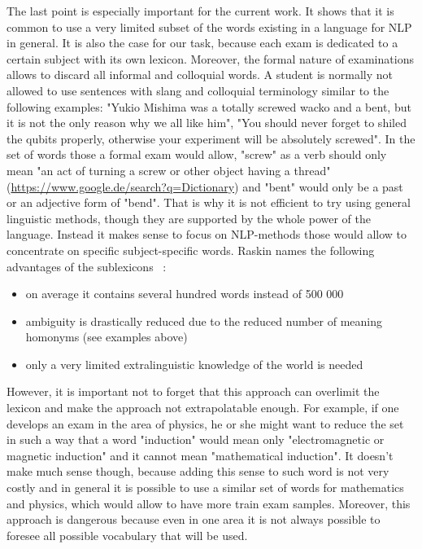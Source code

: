 The last point is especially important for the current work. It shows that it is common to use a very limited subset of the words existing in a language for NLP in general. It is also the case for our task, because each exam is dedicated to a certain subject with its own lexicon. Moreover, the formal nature of examinations allows to discard all informal and colloquial words. A student is normally not allowed to use sentences with slang and colloquial terminology similar to the following examples: "Yukio Mishima was a totally screwed wacko and a bent, but it is not the only reason why we all like him", "You should never forget to shiled the qubits properly, otherwise your experiment will be absolutely screwed". In the set of words those a formal exam would allow, "screw" as a verb should only mean "an act of turning a screw or other object having a thread" (\url{https://www.google.de/search?q=Dictionary}) and "bent" would only be a past or an adjective form of "bend".  That is why it is not efficient to try using general linguistic methods, though they are supported by the whole power of the language. Instead it makes sense to focus on NLP-methods those would allow to concentrate on specific subject-specific words. Raskin names the following advantages of the sublexicons ~\cite{Raskin}:

\begin{itemize}
\item on average it contains several hundred words instead of 500 000  
\item ambiguity is drastically reduced due to the reduced number of meaning homonyms (see examples above)
\item only a very limited extralinguistic knowledge of the world is needed
\end{itemize}

However, it is important not to forget that this approach can overlimit the lexicon and make the approach not extrapolatable enough. For example, if one develops an exam in the area of physics, he or she might want to reduce the set in such a way that a word "induction" would mean only "electromagnetic or magnetic induction" and it cannot mean "mathematical induction". It doesn't make much sense though, because adding this sense to such word is not very costly and in general it is possible to use a similar set of words for mathematics and physics, which would allow to have more train exam samples. Moreover, this approach is dangerous because even in one area it is not always possible to foresee all possible vocabulary that will be used.

